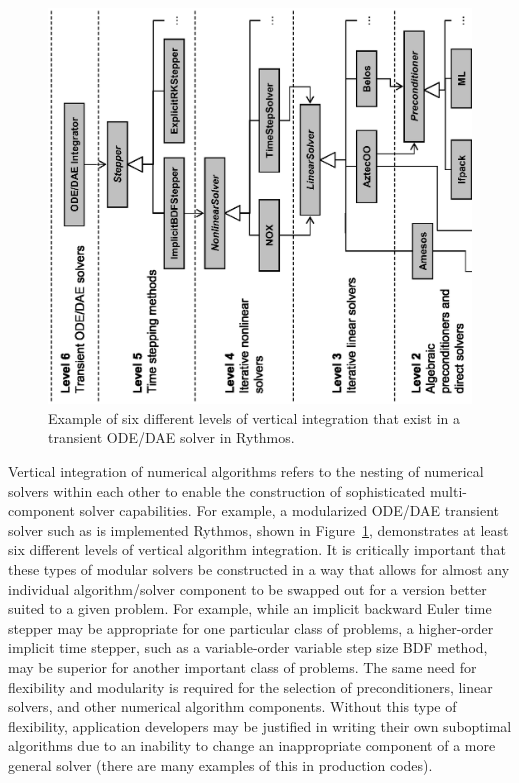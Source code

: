 \documentclass[pdf,ps2pdf,11pt]{SANDreport}
\begin{document}
{\bsinglespace
\begin{figure}[p]
\begin{center}
\includegraphics*[angle=270,scale=0.90
]{VerticalPackageIntegration}
\end{center}
\caption{
\label{fig:VerticalPackageIntegration}
Example of six different levels of vertical integration that exist in a
transient ODE/DAE solver in Rythmos.}
\end{figure}
\esinglespace}

Vertical integration of numerical algorithms refers to the nesting of
numerical solvers within each other to enable the construction of
sophisticated multi-component solver capabilities.  For example, a modularized
ODE/DAE transient solver such as is implemented Rythmos, shown in
Figure~\ref{fig:VerticalPackageIntegration}, demonstrates at least six
different levels of vertical algorithm integration.  It is critically
important that these types of modular solvers be constructed in a way that
allows for almost any individual algorithm/solver component to be swapped out
for a version better suited to a given problem.  For example, while an
implicit backward Euler time stepper may be appropriate for one particular
class of problems, a higher-order implicit time stepper, such as a
variable-order variable step size BDF method, may be superior for another
important class of problems.  The same need for flexibility and modularity is
required for the selection of preconditioners, linear solvers, and other
numerical algorithm components.  Without this type of flexibility, application
developers may be justified in writing their own suboptimal algorithms due to
an inability to change an inappropriate component of a more general solver
(there are many examples of this in production codes).
\end{document}
